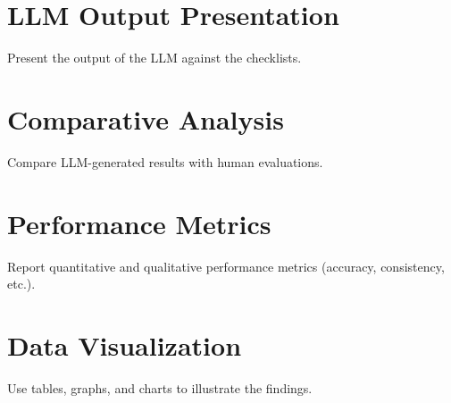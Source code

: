 \documentclass[../main.tex]{subfiles}
\begin{document}
\section*{LLM Output Presentation}
Present the output of the LLM against the checklists.

\section*{Comparative Analysis}
Compare LLM-generated results with human evaluations.

\section*{Performance Metrics}
Report quantitative and qualitative performance metrics (accuracy, consistency, etc.).

\section*{Data Visualization}
Use tables, graphs, and charts to illustrate the findings.
\end{document}
